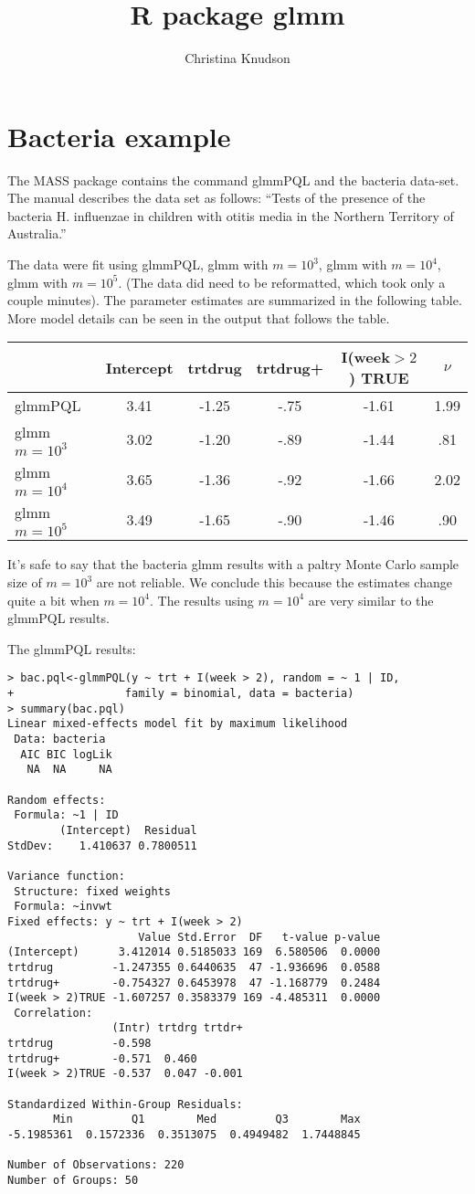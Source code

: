 \documentclass{article}
\title{R package glmm}
\author{Christina Knudson}
\begin{document}
\maketitle{}

\section{Bacteria example}
The MASS package contains the command glmmPQL and the bacteria data-set. The manual describes the data set as follows: ``Tests of the presence of the bacteria H. influenzae in children with otitis media in the Northern Territory of Australia.''

The data were fit using glmmPQL, glmm with $m=10^3$, glmm with $m=10^4$, glmm with $m=10^5$. (The data did need to be reformatted, which took only a couple minutes). The parameter estimates are summarized in the following table. More model details can be seen in the output that follows the table.

\begin{tabular}{lccccc}
& Intercept & trtdrug & trtdrug+ & I(week$>2$) TRUE & $\nu$ \\ \hline
glmmPQL & 3.41 & -1.25 & -.75 & -1.61 & 1.99\\
glmm $m=10^3$ & 3.02 & -1.20 & -.89 & -1.44 & .81 \\
glmm $m=10^4$ & 3.65 & -1.36 & -.92 & -1.66 & 2.02 \\
glmm $m=10^5$ & 3.49& -1.65 & -.90 & -1.46 & .90 \\
\end{tabular}

It's safe to say that the bacteria glmm results with a paltry Monte Carlo sample size of $m=10^3$ are not reliable. We conclude this because the estimates change quite a bit when $m=10^4$. The results using $m=10^4$ are very similar to the glmmPQL results.

The glmmPQL results:
\begin{verbatim}
> bac.pql<-glmmPQL(y ~ trt + I(week > 2), random = ~ 1 | ID,
+                 family = binomial, data = bacteria)
> summary(bac.pql)
Linear mixed-effects model fit by maximum likelihood
 Data: bacteria 
  AIC BIC logLik
   NA  NA     NA

Random effects:
 Formula: ~1 | ID
        (Intercept)  Residual
StdDev:    1.410637 0.7800511

Variance function:
 Structure: fixed weights
 Formula: ~invwt 
Fixed effects: y ~ trt + I(week > 2) 
                    Value Std.Error  DF   t-value p-value
(Intercept)      3.412014 0.5185033 169  6.580506  0.0000
trtdrug         -1.247355 0.6440635  47 -1.936696  0.0588
trtdrug+        -0.754327 0.6453978  47 -1.168779  0.2484
I(week > 2)TRUE -1.607257 0.3583379 169 -4.485311  0.0000
 Correlation: 
                (Intr) trtdrg trtdr+
trtdrug         -0.598              
trtdrug+        -0.571  0.460       
I(week > 2)TRUE -0.537  0.047 -0.001

Standardized Within-Group Residuals:
       Min         Q1        Med         Q3        Max 
-5.1985361  0.1572336  0.3513075  0.4949482  1.7448845 

Number of Observations: 220
Number of Groups: 50 
\end{verbatim}
\end{document}
